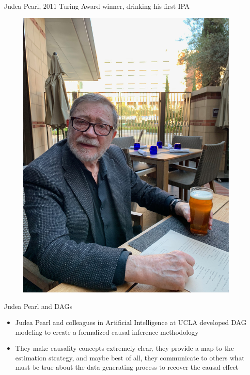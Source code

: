 \documentclass{beamer}
\begin{document}
\begin{frame}{Judea Pearl, 2011 Turing Award winner, drinking his first IPA}

  \begin{figure}
    \includegraphics[scale=0.05]{./lecture_includes/pearl_ipa.jpg}
  \end{figure}

\end{frame}


\begin{frame}{Judea Pearl and DAGs}


  \begin{itemize}
    \item Judea Pearl and colleagues in Artificial Intelligence at UCLA developed DAG modeling to create a formalized causal inference methodology
    \item They make causality concepts extremely clear, they provide a map to the estimation strategy, and maybe best of all, they communicate to others what must be true about the data generating process to recover the causal effect
  \end{itemize}

\end{frame}
\end{document}
